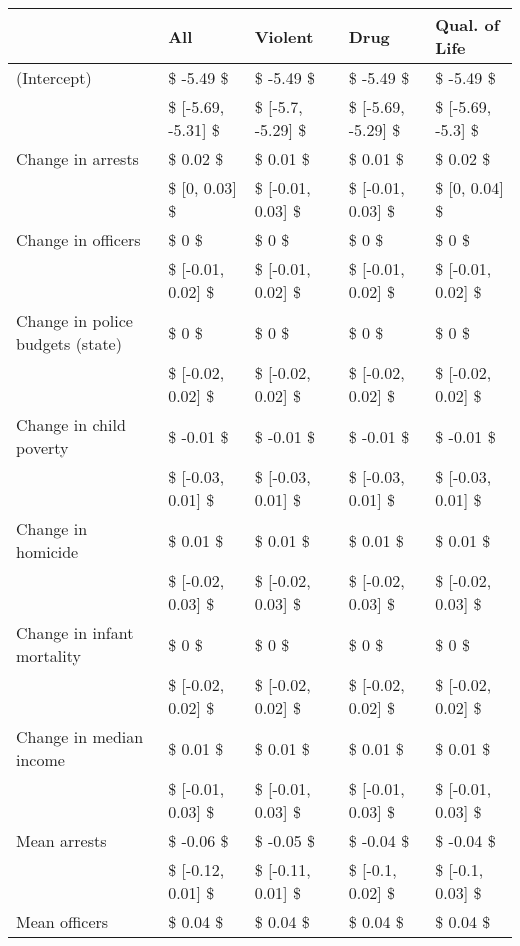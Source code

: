\begin{table}[ht]
\centering
\begin{tabular}{lllll}
  \hline
  & All & Violent & Drug & Qual. of Life \\ 
  \hline
(Intercept) & \$ -5.49 \$ & \$ -5.49 \$ & \$ -5.49 \$ & \$ -5.49 \$ \\ 
   & \$ [-5.69, -5.31] \$ & \$ [-5.7, -5.29] \$ & \$ [-5.69, -5.29] \$ & \$ [-5.69, -5.3] \$ \\ 
  Change in arrests & \$ 0.02 \$ & \$ 0.01 \$ & \$ 0.01 \$ & \$ 0.02 \$ \\ 
   & \$ [0, 0.03] \$ & \$ [-0.01, 0.03] \$ & \$ [-0.01, 0.03] \$ & \$ [0, 0.04] \$ \\ 
  Change in officers & \$ 0 \$ & \$ 0 \$ & \$ 0 \$ & \$ 0 \$ \\ 
   & \$ [-0.01, 0.02] \$ & \$ [-0.01, 0.02] \$ & \$ [-0.01, 0.02] \$ & \$ [-0.01, 0.02] \$ \\ 
  Change in police budgets (state) & \$ 0 \$ & \$ 0 \$ & \$ 0 \$ & \$ 0 \$ \\ 
   & \$ [-0.02, 0.02] \$ & \$ [-0.02, 0.02] \$ & \$ [-0.02, 0.02] \$ & \$ [-0.02, 0.02] \$ \\ 
  Change in child poverty & \$ -0.01 \$ & \$ -0.01 \$ & \$ -0.01 \$ & \$ -0.01 \$ \\ 
   & \$ [-0.03, 0.01] \$ & \$ [-0.03, 0.01] \$ & \$ [-0.03, 0.01] \$ & \$ [-0.03, 0.01] \$ \\ 
  Change in homicide & \$ 0.01 \$ & \$ 0.01 \$ & \$ 0.01 \$ & \$ 0.01 \$ \\ 
   & \$ [-0.02, 0.03] \$ & \$ [-0.02, 0.03] \$ & \$ [-0.02, 0.03] \$ & \$ [-0.02, 0.03] \$ \\ 
  Change in infant mortality & \$ 0 \$ & \$ 0 \$ & \$ 0 \$ & \$ 0 \$ \\ 
   & \$ [-0.02, 0.02] \$ & \$ [-0.02, 0.02] \$ & \$ [-0.02, 0.02] \$ & \$ [-0.02, 0.02] \$ \\ 
  Change in median income & \$ 0.01 \$ & \$ 0.01 \$ & \$ 0.01 \$ & \$ 0.01 \$ \\ 
   & \$ [-0.01, 0.03] \$ & \$ [-0.01, 0.03] \$ & \$ [-0.01, 0.03] \$ & \$ [-0.01, 0.03] \$ \\ 
  Mean arrests & \$ -0.06 \$ & \$ -0.05 \$ & \$ -0.04 \$ & \$ -0.04 \$ \\ 
   & \$ [-0.12, 0.01] \$ & \$ [-0.11, 0.01] \$ & \$ [-0.1, 0.02] \$ & \$ [-0.1, 0.03] \$ \\ 
  Mean officers & \$ 0.04 \$ & \$ 0.04 \$ & \$ 0.04 \$ & \$ 0.04 \$ \\ 

\end{tabular}
\end{table}
